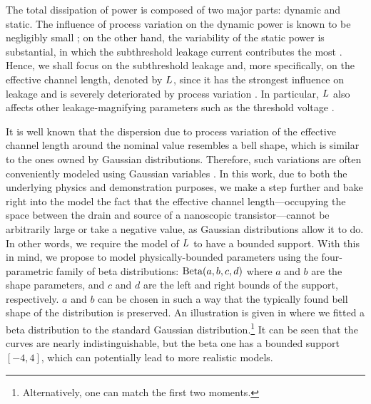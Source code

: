 The total dissipation of power is composed of two major parts: dynamic and static.
The influence of process variation on the dynamic power is known to be negligibly small \cite{srivastava2010}; on the other hand, the variability of the static power is substantial, in which the subthreshold leakage current contributes the most \cite{juan2011, juan2012}.
Hence, we shall focus on the subthreshold leakage and, more specifically, on the effective channel length, denoted by $L$, since it has the strongest influence on leakage and is severely deteriorated by process variation \cite{chandrakasan2001}.
In particular, $L$ also affects other leakage-magnifying parameters such as the threshold voltage \cite{juan2011}.

It is well known that the dispersion due to process variation of the effective channel length around the nominal value resembles a bell shape, which is similar to the ones owned by Gaussian distributions.
Therefore, such variations are often conveniently modeled using Gaussian variables \cite{srivastava2010, juan2011, juan2012, chandra2010, huang2009, lee2013, shen2009, bhardwaj2006, ghanta2006}.
In this work, due to both the underlying physics and demonstration purposes, we make a step further and bake right into the model the fact that the effective channel length---occupying the space between the drain and source of a nanoscopic transistor---cannot be arbitrarily large or take a negative value, as Gaussian distributions allow it to do.
In other words, we require the model of $L$ to have a bounded support.
With this in mind, we propose to model physically-bounded parameters using the four-parametric family of beta distributions: $\text{Beta}(a, b, c, d)$ where $a$ and $b$ are the shape parameters, and $c$ and $d$ are the left and right bounds of the support, respectively.
$a$ and $b$ can be chosen in such a way that the typically found bell shape of the distribution is preserved.
An illustration is given in  where we fitted a beta distribution to the standard Gaussian distribution.\footnote{Alternatively, one can match the first two moments.}
It can be seen that the curves are nearly indistinguishable, but the beta one has a bounded support $[-4, 4]$, which can potentially lead to more realistic models.

